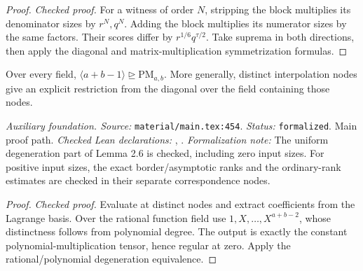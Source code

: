 \begin{proof}
\leanok
{}
\textit{Checked proof.} For a witness of order $N$, stripping the block multiplies its denominator sizes by $r^N,q^N$. Adding the block multiplies its numerator sizes by the same factors. Their scores differ by $r^{1/6}q^{\tau/2}$. Take suprema in both directions, then apply the diagonal and matrix-multiplication symmetrization formulas.
\end{proof}

\renewcommand{\thetheorem}{A62}
\begin{lemma}
\label{aux:polynomial-multiplication-degeneration}
\leanok
Over every field, $\langle a+b-1\rangle\trianglerighteq\mathrm{PM}_{a,b}$. More generally, distinct interpolation nodes give an explicit restriction from the diagonal over the field containing those nodes.
\end{lemma}

\noindent\textit{Auxiliary foundation. Source:} \texttt{material/main.tex:454}.
\textit{Status:} \texttt{formalized}. Main proof path.
\textit{Checked Lean declarations:} , .
\textit{Formalization note:} The uniform degeneration part of Lemma 2.6 is checked, including zero input sizes. For positive input sizes, the exact border/asymptotic ranks and the ordinary-rank estimates are checked in their separate correspondence nodes.

\begin{proof}
\leanok
{}
\textit{Checked proof.} Evaluate at distinct nodes and extract coefficients from the Lagrange basis. Over the rational function field use $1,X,\ldots,X^{a+b-2}$, whose distinctness follows from polynomial degree. The output is exactly the constant polynomial-multiplication tensor, hence regular at zero. Apply the rational/polynomial degeneration equivalence.
\end{proof}

